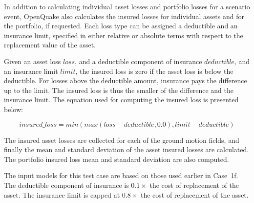 In addition to calculating individual asset losses and portfolio losses for a scenario event, OpenQuake also calculates the insured losses for individual assets and for the portfolio, if requested. Each loss type can be assigned a deductible and an insurance limit, specified in either relative or absolute terms with respect to the replacement value of the asset.

Given an asset loss $loss$, and a deductible component of insurance $deductible$, and an insurance limit $limit$, the insured loss is zero if the asset loss is below the deductible. For losses above the deductible amount, insurance pays the difference up to the limit. The insured loss is thus the smaller of the difference and the insurance limit. The equation used for computing the insured loss is presented below:

\begin{equation}
	insured\_loss = min(max(loss - deductible, 0.0), limit - deductible)
\end{equation}

The insured asset losses are collected for each of the ground motion fields, and finally the mean and standard deviation of the asset insured losses are calculated. The portfolio insured loss mean and standard deviation are also computed.

The input models for this test case are based on those used earlier in Case~1f. The deductible component of insurance is $0.1\times$ the cost of replacement of the asset. The insurance limit is capped at $0.8\times$ the cost of replacement of the asset.